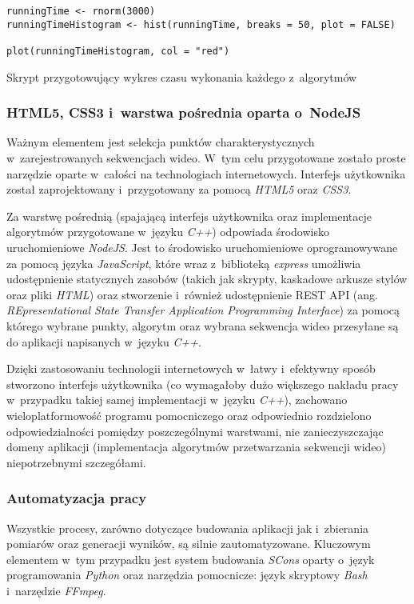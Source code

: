       \begin{sample}[ht]
        \begin{verbatim}
runningTime <- rnorm(3000)
runningTimeHistogram <- hist(runningTime, breaks = 50, plot = FALSE)

plot(runningTimeHistogram, col = "red")
        \end{verbatim}
        \caption{Skrypt przygotowujący wykres czasu wykonania każdego z~algorytmów}
        \label{ChartForRunningTimePerAlgorithm}
      \end{sample}

      \subsubsection{HTML5, CSS3 i~warstwa pośrednia oparta o~NodeJS}
      Ważnym elementem jest selekcja punktów charakterystycznych w~zarejestrowanych sekwencjach wideo. W~tym celu przygotowane zostało proste narzędzie oparte w~całości na technologiach internetowych. Interfejs użytkownika został zaprojektowany i~przygotowany za pomocą \textit{HTML5} oraz \textit{CSS3}.

      Za warstwę pośrednią (spajającą interfejs użytkownika oraz implementacje algorytmów przygotowane w~języku \textit{C++}) odpowiada środowisko uruchomieniowe \textit{NodeJS}. Jest to środowisko uruchomieniowe oprogramowywane za pomocą języka \textit{JavaScript}, które wraz z~biblioteką \textit{express} umożliwia udostępnienie statycznych zasobów (takich jak skrypty, kaskadowe arkusze stylów oraz pliki \textit{HTML}) oraz stworzenie i~również udostępnienie REST API (ang. \textit{REpresentational State Transfer Application Programming Interface}) za pomocą którego wybrane punkty, algorytm oraz wybrana sekwencja wideo przesyłane są do aplikacji napisanych w~języku \textit{C++}.

      Dzięki zastosowaniu technologii internetowych w~łatwy i~efektywny sposób stworzono interfejs użytkownika (co wymagałoby dużo większego nakładu pracy w~przypadku takiej samej implementacji w~języku \textit{C++}), zachowano wieloplatformowość programu pomocniczego oraz odpowiednio rozdzielono odpowiedzialności pomiędzy poszczególnymi warstwami, nie zanieczyszczając domeny aplikacji (implementacja algorytmów przetwarzania sekwencji wideo) niepotrzebnymi szczegółami.

      \subsubsection{Automatyzacja pracy}
      Wszystkie procesy, zarówno dotyczące budowania aplikacji jak i~zbierania pomiarów oraz generacji wyników, są silnie zautomatyzowane. Kluczowym elementem w~tym przypadku jest system budowania \textit{SCons} oparty o~język programowania \textit{Python} oraz narzędzia pomocnicze: język skryptowy \textit{Bash} i~narzędzie \textit{FFmpeg}.

